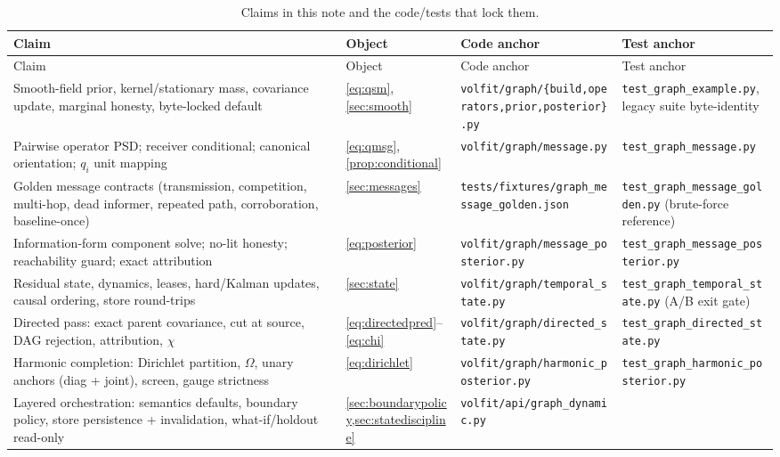\documentclass[11pt]{article}
\begin{document}
\begingroup
\small
\setlength{\tabcolsep}{3pt}
\begin{longtable}{@{}p{}p{}p{}p{}@{}}
\caption{Claims in this note and the code/tests that lock them.}\\
\toprule Claim & Object & Code anchor & Test anchor\\ \midrule
\endfirsthead
\toprule Claim & Object & Code anchor & Test anchor\\ \midrule
\endhead
Smooth-field prior, kernel/stationary mass, covariance update, marginal
honesty, byte-locked default &
\eqref{eq:qsm}, \cref{sec:smooth} &
\nolinkurl{volfit/graph/\{build,operators,prior,posterior\}.py} &
\nolinkurl{test_graph_example.py}, legacy suite byte-identity\\
Pairwise operator PSD; receiver conditional; canonical orientation;
$q_i$ unit mapping &
\eqref{eq:qmsg}, \cref{prop:conditional} &
\nolinkurl{volfit/graph/message.py} &
\nolinkurl{test_graph_message.py}\\
Golden message contracts (transmission, competition, multi-hop, dead
informer, repeated path, corroboration, baseline-once) &
\cref{sec:messages} &
\nolinkurl{tests/fixtures/graph_message_golden.json} &
\nolinkurl{test_graph_message_golden.py} (brute-force reference)\\
Information-form component solve; no-lit honesty; reachability guard;
exact attribution &
\eqref{eq:posterior} &
\nolinkurl{volfit/graph/message_posterior.py} &
\nolinkurl{test_graph_message_posterior.py}\\
Residual state, dynamics, leases, hard/Kalman updates, causal ordering,
store round-trips &
\cref{sec:state} &
\nolinkurl{volfit/graph/temporal_state.py} &
\nolinkurl{test_graph_temporal_state.py} (A/B exit gate)\\
Directed pass: exact parent covariance, cut at source, DAG rejection,
attribution, $\chi$ &
\eqref{eq:directedpred}--\eqref{eq:chi} &
\nolinkurl{volfit/graph/directed_state.py} &
\nolinkurl{test_graph_directed_state.py}\\
Harmonic completion: Dirichlet partition, $\Omega$, unary anchors
(diag + joint), screen, gauge strictness &
\eqref{eq:dirichlet} &
\nolinkurl{volfit/graph/harmonic_posterior.py} &
\nolinkurl{test_graph_harmonic_posterior.py}\\
Layered orchestration: semantics defaults, boundary policy, store
persistence + invalidation, what-if/holdout read-only &
\cref{sec:boundarypolicy,sec:statediscipline} &
\nolinkurl{volfit/api/graph_dynamic.py} &

\end{longtable}
\end{document}
